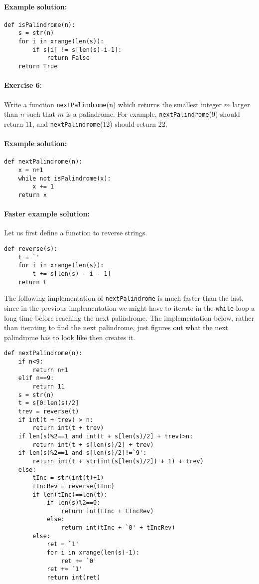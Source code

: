 \documentclass[11pt]{article}
\begin{document}
\paragraph{Example solution:}
\begin{verbatim}
def isPalindrome(n):
    s = str(n)
    for i in xrange(len(s)):
        if s[i] != s[len(s)-i-1]:
            return False
    return True
\end{verbatim}

\paragraph{Exercise 6:}
Write a function \texttt{nextPalindrome}(n) which returns the smallest
integer $m$ larger than $n$ such that $m$ is a palindrome.  For
example, \texttt{nextPalindrome}(9) should return $11$, and
\texttt{nextPalindrome}(12) should return 22.

\paragraph{Example solution:}
\begin{verbatim}
def nextPalindrome(n):
    x = n+1
    while not isPalindrome(x):
        x += 1
    return x
\end{verbatim}

\paragraph{Faster example solution:}
Let us first define a function to reverse strings.

\begin{verbatim}
def reverse(s):
    t = `'
    for i in xrange(len(s)):
        t += s[len(s) - i - 1]
    return t
\end{verbatim}

The following implementation of \texttt{nextPalindrome} is much faster
than the last, since in the
previous implementation we might have to iterate in the \texttt{while}
loop a long time before reaching the next palindrome. The
implementation below, rather than iterating to find the next
palindrome, just figures out what the next palindrome has to look like
then creates it.

\begin{verbatim}
def nextPalindrome(n):
    if n<9:
        return n+1
    elif n==9:
        return 11
    s = str(n)
    t = s[0:len(s)/2]
    trev = reverse(t)
    if int(t + trev) > n:
        return int(t + trev)
    if len(s)%2==1 and int(t + s[len(s)/2] + trev)>n:
        return int(t + s[len(s)/2] + trev)
    if len(s)%2==1 and s[len(s)/2]!=`9':
        return int(t + str(int(s[len(s)/2]) + 1) + trev)
    else:
        tInc = str(int(t)+1)
        tIncRev = reverse(tInc)
        if len(tInc)==len(t):
            if len(s)%2==0:
                return int(tInc + tIncRev)
            else:
                return int(tInc + `0' + tIncRev)
        else:
            ret = `1'
            for i in xrange(len(s)-1):
                ret += `0'
            ret += `1'
            return int(ret)
\end{verbatim}
\end{document}
